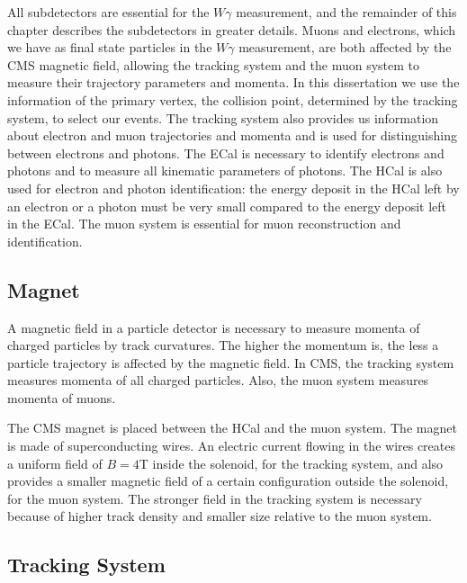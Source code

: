 All subdetectors are essential for the $W\gamma$ measurement, and the remainder of this chapter describes the subdetectors in greater details. Muons and electrons, which we have as final state particles in the $W\gamma$ measurement, are both affected by the CMS magnetic field, allowing the tracking system and the muon system to measure their trajectory parameters and momenta. In this dissertation we use the information of the primary vertex, the collision point, determined by the tracking system, to select our events. The tracking system also provides us information about electron and muon trajectories and momenta and is used for distinguishing between electrons and photons. The ECal is necessary to identify electrons and photons and to measure all kinematic parameters of photons. The HCal is also used for electron and photon identification: the energy deposit in the HCal left by an electron or a photon must be very small compared to the energy deposit left in the ECal. The muon system is essential for muon reconstruction and identification.

\clearpage

\subsection{Magnet}

A magnetic field in a particle detector is necessary to measure momenta of charged particles by track curvatures. The higher the momentum is, the less a particle trajectory is affected by the magnetic field. In CMS, the tracking system measures  momenta of all charged particles. Also, the muon system measures momenta of muons. 

The CMS magnet is placed between the HCal and the muon system. The magnet is made of superconducting wires. An electric current flowing in the wires creates a uniform field of $B=4$T inside the solenoid, for the tracking system, and also provides a smaller magnetic field of a certain configuration outside the solenoid, for the muon system. The stronger field in the tracking system is necessary because of higher track density and smaller size relative to the muon system.

\subsection{Tracking System}

